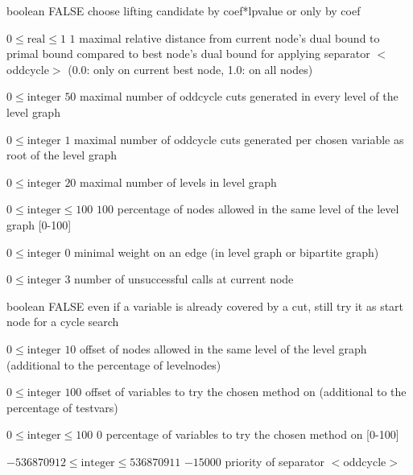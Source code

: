 %
{boolean}%
{FALSE}%
{choose lifting candidate by coef*lpvalue or only by coef}%
{}

%
{$0\leq\textrm{real}\leq1$}%
{$1$}%
{maximal relative distance from current node's dual bound to primal bound compared to best node's dual bound for applying separator $<$oddcycle$>$ (0.0: only on current best node, 1.0: on all nodes)}%
{}

%
{$0\leq\textrm{integer}$}%
{$50$}%
{maximal number of oddcycle cuts generated in every level of the level graph}%
{}

%
{$0\leq\textrm{integer}$}%
{$1$}%
{maximal number of oddcycle cuts generated per chosen variable as root of the level graph}%
{}

%
{$0\leq\textrm{integer}$}%
{$20$}%
{maximal number of levels in level graph}%
{}

%
{$0\leq\textrm{integer}\leq100$}%
{$100$}%
{percentage of nodes allowed in the same level of the level graph [0-100]}%
{}

%
{$0\leq\textrm{integer}$}%
{$0$}%
{minimal weight on an edge (in level graph or bipartite graph)}%
{}

%
{$0\leq\textrm{integer}$}%
{$3$}%
{number of unsuccessful calls at current node}%
{}

%
{boolean}%
{FALSE}%
{even if a variable is already covered by a cut, still try it as start node for a cycle search}%
{}

%
{$0\leq\textrm{integer}$}%
{$10$}%
{offset of nodes allowed in the same level of the level graph (additional to the percentage of levelnodes)}%
{}

%
{$0\leq\textrm{integer}$}%
{$100$}%
{offset of variables to try the chosen method on (additional to the percentage of testvars)}%
{}

%
{$0\leq\textrm{integer}\leq100$}%
{$0$}%
{percentage of variables to try the chosen method on [0-100]}%
{}

%
{$-536870912\leq\textrm{integer}\leq536870911$}%
{$-15000$}%
{priority of separator $<$oddcycle$>$}%
{}

